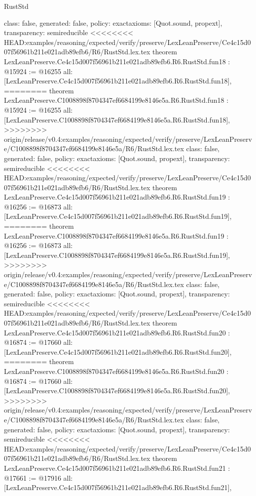 \begin{lexlean}{RustStd}
\begin{coremodule}
{\begin{coremodule}
{{{{{{{{{{{{{{{{{{{{{  class: false,
  generated: false,
  policy: exact{axioms: [Quot.sound, propext]},
  transparency: semireducible
}
<<<<<<<< HEAD:examples/reasoning/expected/verify/preserve/LexLeanPreserve/Ce4c15d007f56961b211e021adb89efb6/R6/RustStd.lex.tex
theorem LexLeanPreserve.Ce4c15d007f56961b211e021adb89efb6.R6.RustStd.fun18 : @15924 := @16255 {
  all: [LexLeanPreserve.Ce4c15d007f56961b211e021adb89efb6.R6.RustStd.fun18],
========
theorem LexLeanPreserve.C1008898f8704347ef6684199e8146e5a.R6.RustStd.fun18 : @15924 := @16255 {
  all: [LexLeanPreserve.C1008898f8704347ef6684199e8146e5a.R6.RustStd.fun18],
>>>>>>>> origin/release/v0.4:examples/reasoning/expected/verify/preserve/LexLeanPreserve/C1008898f8704347ef6684199e8146e5a/R6/RustStd.lex.tex
  class: false,
  generated: false,
  policy: exact{axioms: [Quot.sound, propext]},
  transparency: semireducible
}
<<<<<<<< HEAD:examples/reasoning/expected/verify/preserve/LexLeanPreserve/Ce4c15d007f56961b211e021adb89efb6/R6/RustStd.lex.tex
theorem LexLeanPreserve.Ce4c15d007f56961b211e021adb89efb6.R6.RustStd.fun19 : @16256 := @16873 {
  all: [LexLeanPreserve.Ce4c15d007f56961b211e021adb89efb6.R6.RustStd.fun19],
========
theorem LexLeanPreserve.C1008898f8704347ef6684199e8146e5a.R6.RustStd.fun19 : @16256 := @16873 {
  all: [LexLeanPreserve.C1008898f8704347ef6684199e8146e5a.R6.RustStd.fun19],
>>>>>>>> origin/release/v0.4:examples/reasoning/expected/verify/preserve/LexLeanPreserve/C1008898f8704347ef6684199e8146e5a/R6/RustStd.lex.tex
  class: false,
  generated: false,
  policy: exact{axioms: [Quot.sound, propext]},
  transparency: semireducible
}
<<<<<<<< HEAD:examples/reasoning/expected/verify/preserve/LexLeanPreserve/Ce4c15d007f56961b211e021adb89efb6/R6/RustStd.lex.tex
theorem LexLeanPreserve.Ce4c15d007f56961b211e021adb89efb6.R6.RustStd.fun20 : @16874 := @17660 {
  all: [LexLeanPreserve.Ce4c15d007f56961b211e021adb89efb6.R6.RustStd.fun20],
========
theorem LexLeanPreserve.C1008898f8704347ef6684199e8146e5a.R6.RustStd.fun20 : @16874 := @17660 {
  all: [LexLeanPreserve.C1008898f8704347ef6684199e8146e5a.R6.RustStd.fun20],
>>>>>>>> origin/release/v0.4:examples/reasoning/expected/verify/preserve/LexLeanPreserve/C1008898f8704347ef6684199e8146e5a/R6/RustStd.lex.tex
  class: false,
  generated: false,
  policy: exact{axioms: [Quot.sound, propext]},
  transparency: semireducible
}
<<<<<<<< HEAD:examples/reasoning/expected/verify/preserve/LexLeanPreserve/Ce4c15d007f56961b211e021adb89efb6/R6/RustStd.lex.tex
theorem LexLeanPreserve.Ce4c15d007f56961b211e021adb89efb6.R6.RustStd.fun21 : @17661 := @17916 {
  all: [LexLeanPreserve.Ce4c15d007f56961b211e021adb89efb6.R6.RustStd.fun21],
}}}}}}}}}}}}}}}}}}}}}}}}
\end{coremodule}}
\end{coremodule}
\end{lexlean}
